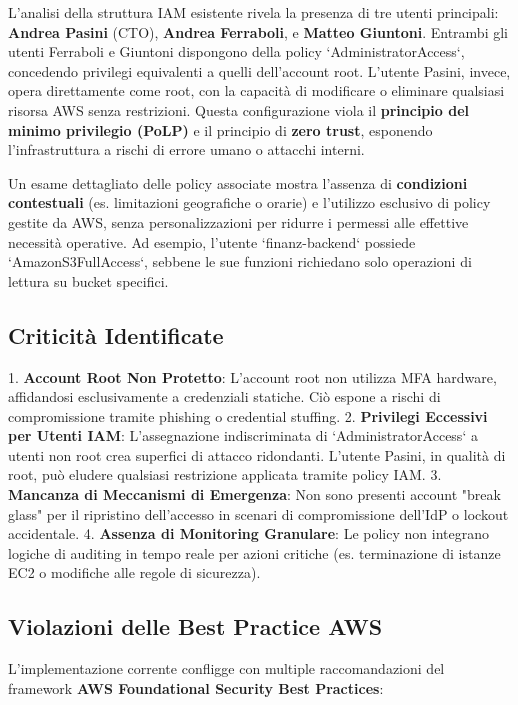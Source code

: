 L'analisi della struttura IAM esistente rivela la presenza di tre utenti principali: \textbf{Andrea Pasini} (CTO), \textbf{Andrea Ferraboli}, e \textbf{Matteo Giuntoni}. Entrambi gli utenti Ferraboli e Giuntoni dispongono della policy `AdministratorAccess`, concedendo privilegi equivalenti a quelli dell'account root. L'utente Pasini, invece, opera direttamente come root, con la capacità di modificare o eliminare qualsiasi risorsa AWS senza restrizioni. Questa configurazione viola il \textbf{principio del minimo privilegio (PoLP)} e il principio di \textbf{zero trust}, esponendo l'infrastruttura a rischi di errore umano o attacchi interni\cite{ref5}.

Un esame dettagliato delle policy associate mostra l'assenza di \textbf{condizioni contestuali} (es. limitazioni geografiche o orarie) e l'utilizzo esclusivo di policy gestite da AWS, senza personalizzazioni per ridurre i permessi alle effettive necessità operative\cite{ref6}. Ad esempio, l'utente `finanz-backend` possiede `AmazonS3FullAccess`, sebbene le sue funzioni richiedano solo operazioni di lettura su bucket specifici.

\subsection{Criticità Identificate}

1. \textbf{Account Root Non Protetto}: L'account root non utilizza MFA hardware, affidandosi esclusivamente a credenziali statiche\cite{ref3}. Ciò espone a rischi di compromissione tramite phishing o credential stuffing.
2. \textbf{Privilegi Eccessivi per Utenti IAM}: L'assegnazione indiscriminata di `AdministratorAccess` a utenti non root crea superfici di attacco ridondanti. L'utente Pasini, in qualità di root, può eludere qualsiasi restrizione applicata tramite policy IAM\cite{ref2}.
3. \textbf{Mancanza di Meccanismi di Emergenza}: Non sono presenti account "break glass" per il ripristino dell'accesso in scenari di compromissione dell'IdP o lockout accidentale\cite{ref4}.
4. \textbf{Assenza di Monitoring Granulare}: Le policy non integrano logiche di auditing in tempo reale per azioni critiche (es. terminazione di istanze EC2 o modifiche alle regole di sicurezza)\cite{ref7}.

\subsection{Violazioni delle Best Practice AWS}

L'implementazione corrente confligge con multiple raccomandazioni del framework \textbf{AWS Foundational Security Best Practices}:

